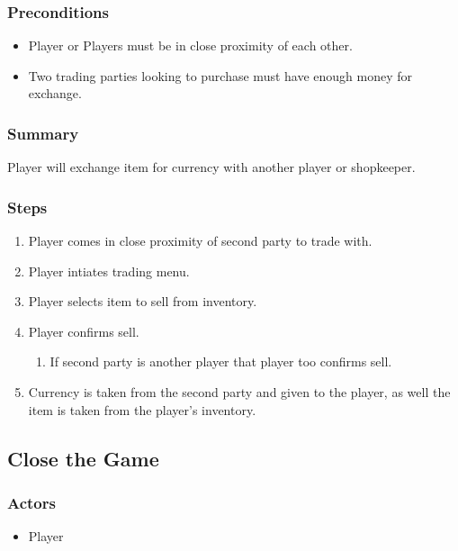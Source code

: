 \documentclass[12pt]{report}
\begin{document}
    \subsubsection{Preconditions}
    \begin{itemize}
        \item Player or Players must be in close proximity of each other.
        \item Two trading parties looking to purchase must have enough money for exchange.
    \end{itemize}

    \subsubsection{Summary}
    Player will exchange item for currency with another player or shopkeeper.

    \subsubsection{Steps}
    \begin{enumerate}
        \item Player comes in close proximity of second party to trade with.
        \item Player intiates trading menu.
        \item Player selects item to sell from inventory.
        \item Player confirms sell.
            \begin{enumerate}
                \item If second party is another player that player too confirms sell.
            \end{enumerate}
        \item Currency is taken from the second party and given to the player, as well the item is taken from the player's inventory.
    \end{enumerate}

    \subsection{Close the Game}
        \subsubsection{Actors}
        \begin{itemize}
            \item Player
        \end{itemize}
\end{document}

